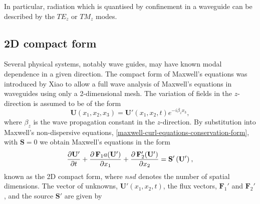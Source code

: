 In particular, radiation which is quantised by confinement in a waveguide can be described by the $TE_z$ or $TM_z$ modes.

\subsection{2D compact form}

Several physical systems, notably wave guides, may have known modal dependence in a given direction. The compact form of Maxwell's equations was introduced by Xiao \cite{Xiao:1992be} to allow a full wave analysis of Maxwell's equations in waveguides using only a 2-dimensional mesh. The variation of fields in the $z$-direction is assumed to be of the form
\begin{equation}
    \mathbf{U}(x_1,x_2,x_3) = \mathbf{U}'(x_1, x_2,t) e^{-i \beta_z x_3},
\label{compact2D-zdep}
\end{equation}
where $\beta_z$ is the wave propagation constant in the $z$-direction. By substitution into Maxwell's non-dispersive equations, \eqref{maxwell-curl-equations-conservation-form}, with $\mathbf{S} = 0$ we obtain Maxwell's equations in the form
\begin{equation}
\frac{\partial  \mathbf{U}'}{\partial t}+ 
\frac { \partial \, \mathbf{F}_1a(\mathbf{U}') }{ \partial x_1 } +
\frac { \partial \, \mathbf{F}_2'(\mathbf{U}') }{ \partial x_2 } =
\mathbf{S}'\,(\mathbf{U}') \: ,
\end{equation}
known as the 2D compact form, where $nsd$ denotes the number of spatial dimensions. The vector of unknowns, $\mathbf{U}'(x_1,x_2,t)$, the flux vectors, $\mathbf{F}_1'$ and $\mathbf{F}_2'$, and the source $\mathbf{S}'$ are given by
